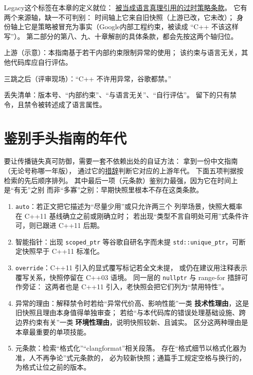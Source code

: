 \documentclass[12pt,a4paper,fontset=fandol]{ctexbook}
\newcommand{\cpp}[1]{C++#1}
\newcommand{\Tp}[1]{\texttt{#1}}
\newcommand{\Bk}{\discretionary{}{}{}}
\newcommand{\Lang}[1]{\textsf{#1}}
\newcommand{\CPP}{\Lang{C++}}
\newcommand{\DomGo}{\Lang{Google}}
\newcommand{\DomTra}{\Lang{Legacy}}
\begin{document}
\DomTra 这个标签在本章的定义就位：
\underline{被当成语言真理引用的过时策略条款}。
它有两个来源轴，缺一不可判别：
时间轴上它来自旧快照（上游已改，它未改）；
身份轴上它是策略被冒充为事实（\DomGo 内部工程约束，被读成
``\CPP{} 不该这样写''）。
第二部分的第八、九、十章解剖的具体条款，都会先按这两个轴归位。

\begin{compare}[title={同一句话在链条两端的样子}]
  上游（示意）：本指南基于若干内部约束限制异常的使用；
  该约束与语言无关，其他代码库应自行评估。

  三跳之后（评审现场）：``\CPP{} 不许用异常，谷歌都禁。''

  丢失清单：版本号、``内部约束''、``与语言无关''、``自行评估''。
  留下的只有禁令，且禁令被转述成了语言属性。
\end{compare}

\section{鉴别手头指南的年代}
\label{sec:ch07-dating}

要让传播链失真可防御，需要一套不依赖出处的自证方法：
拿到一份中文指南（无论号称哪一年版），
通过它的\underline{措辞}判断它对应的上游年代。
下面五项判据按检索的先后顺序排列。
其中最后一项（元条款）鉴别力最强，因为它在时间上是``有无''之别
而非``多寡''之别：早期快照里根本不存在这类条款。

\begin{guideline}[title={五特征断代法：拿到指南先查这五处措辞}]
  \begin{enumerate}[label=\arabic*., leftmargin=2.6em]
    \item \Tp{auto}：若正文把它描述为``尽量少用''或只允许两三个
          列举场景，快照大概率在 \cpp{11} 基线确立之前或刚确立时；
          若出现``类型不言自明处可用''式条件许可，则已跟进 \cpp{11} 后期。
    \item 智能指针：出现 \Tp{scoped\_ptr} 等谷歌自研名字而未提
          \Tp{std::unique\_ptr}，可断定快照早于 \cpp{11} 标准化。
    \item \Tp{override}：\cpp{11} 引入的显式覆写标记若全文未提，
          或仍在建议用注释表示覆写关系，快照停留在 \cpp{03} 语境。
          同一层的 \Tp{nullptr} 与 range-for 措辞可作旁证：
          这两者也是 \cpp{11} 引入，老快照会把它们列为``禁用特性''。
    \item 异常的理由：解释禁令时若给``异常代价高、影响性能''一类
          \textbf{技术性理由}，这是旧快照且理由本身值得单独审查；
          若给``与本代码库的错误处理基础设施、跨边界约束有关''一类
          \textbf{环境性理由}，说明快照较新、且诚实。
          区分这两种理由是本章最重要的单项技能。
    \item 元条款：检索``格式化''``clang{\Bk}format''相关段落。
          存在``格式细节以格式化器为准，人不再争论''式元条款的，
          必为较新快照；通篇手工规定空格与换行的，为格式让位之前的版本。
  \end{enumerate}
\end{guideline}
\end{document}
